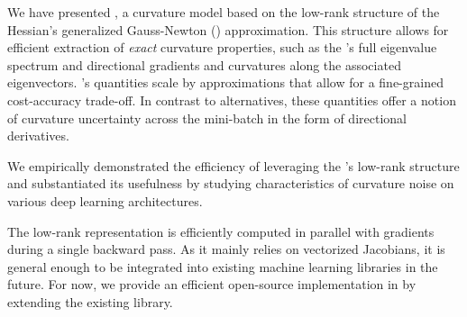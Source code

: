 We have presented \vivit, a curvature model based on the low-rank structure of
the Hessian's generalized Gauss-Newton (\ggn) approximation. This structure
allows for efficient extraction of \textit{exact} curvature properties, such as
the \ggn{}'s full eigenvalue spectrum and directional gradients and curvatures
along the associated eigenvectors. \vivit's quantities scale by approximations
that allow for a fine-grained cost-accuracy trade-off. In contrast to
alternatives, these quantities offer a notion of curvature uncertainty across
the mini-batch in the form of directional derivatives.

We empirically demonstrated the efficiency of leveraging the \ggn's low-rank
structure and substantiated its usefulness by studying characteristics of
curvature noise on various deep learning architectures.


The low-rank representation is efficiently computed in parallel with gradients
during a single backward pass. As it mainly relies on vectorized Jacobians, it
is general enough to be integrated into existing machine learning libraries in
the future. For now, we provide an efficient open-source implementation in
\pytorch \cite{paszke2019pytorch} by extending the existing \backpack
\cite{dangel2020backpack} library.

